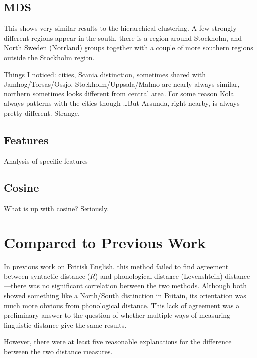 \subsection{MDS}

This shows very similar results to the hierarchical clustering. A
few strongly different regions appear in the south, there is a region
around Stockholm, and North Sweden (Norrland) groups together with a
couple of more southern regions outside the Stockholm region.

Things I noticed: cities, Scania distinction, sometimes shared with
Jamhog/Torsas/Ossjo, Stockholm/Uppsala/Malmo are nearly always
similar, northern sometimes looks different from central area. For
some reason Kola always patterns with the cities though \ldots But
Arsunda, right nearby, is always pretty different. Strange.

\subsection{Features}

Analysis of specific features

\subsection{Cosine}

What is up with cosine? Seriously.

\section{Compared to Previous Work}

In previous work on British English, this method failed to find
agreement between syntactic distance ($R$) and phonological distance
(Levenshtein) distance---there was no
significant correlation between the two methods. Although both showed
something like a North/South distinction in Britain, its orientation was much more
obvious from phonological distance. This lack of agreement was a
preliminary answer to the question of whether multiple
ways of measuring linguistic distance give the same results.

However, there were at least five reasonable explanations for the difference
between the two distance measures.

